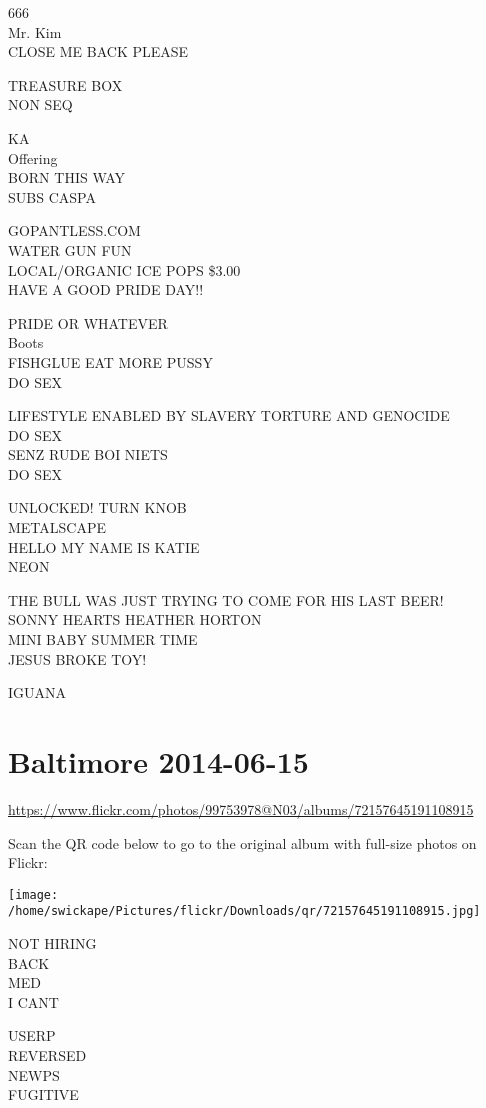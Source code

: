 \documentclass[10pt,letterpaper]{article}
\begin{document}
666\\
Mr. Kim\\
CLOSE ME BACK PLEASE

TREASURE BOX\\
NON SEQ

KA\\
Offering\\
BORN THIS WAY\\
SUBS CASPA

GOPANTLESS.COM\\
WATER GUN FUN\\
LOCAL/ORGANIC ICE POPS \$3.00\\
HAVE A GOOD PRIDE DAY!!

PRIDE OR WHATEVER\\
Boots\\
FISHGLUE EAT MORE PUSSY\\
DO SEX

LIFESTYLE ENABLED BY SLAVERY TORTURE AND GENOCIDE\\
DO SEX\\
SENZ RUDE BOI NIETS\\
DO SEX

UNLOCKED!  TURN KNOB\\
METALSCAPE\\
HELLO MY NAME IS KATIE\\
NEON

THE BULL WAS JUST TRYING TO COME FOR HIS LAST BEER!\\
SONNY HEARTS HEATHER HORTON\\
MINI BABY SUMMER TIME\\
JESUS BROKE TOY!

IGUANA


\section*{Baltimore 2014-06-15}

\url{https://www.flickr.com/photos/99753978@N03/albums/72157645191108915}

Scan the QR code below to go to the original album with full-size photos on Flickr:

\texttt{[image: /home/swickape/Pictures/flickr/Downloads/qr/72157645191108915.jpg]}


NOT HIRING\\
BACK\\
MED\\
I CANT

USERP\\
REVERSED\\
NEWPS\\
FUGITIVE
\end{document}
